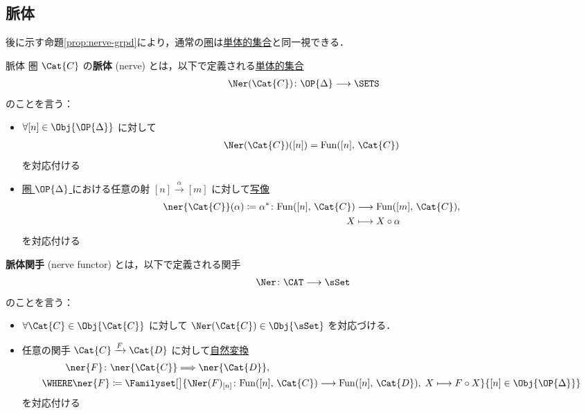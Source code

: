 \documentclass[TQFT_main]{subfiles}
\begin{document}
\subsection{脈体}

後に示す命題\ref{prop:nerve-grpd}により，通常の\hyperref[def:category]{圏}は\hyperref[def:SimpSet]{単体的集合}と同一視できる．

\begin{mydef}[label=def:nerve,breakable]{脈体}
        圏 $\Cat{C}$ の\textbf{脈体} (nerve) とは，以下で定義される\hyperref[def:SimpSet]{単体的集合}
        \begin{align}
            \Ner (\Cat{C}) \colon \OP{\Delta} \lto \SETS
        \end{align}
        のことを言う：
        \begin{itemize}
            \item $\forall [n] \in \Obj{\OP{\Delta}}$ に対して
            \begin{align}
                \Ner (\Cat{C}) ([n]) = \mathrm{Fun} ([n],\, \Cat{C})
            \end{align}
            を対応付ける
            \item \hyperref[def:simplex-cat]{圏 $\OP{\Delta}$ }における任意の射 $[n] \xrightarrow{\alpha} [m]$ に対して\underline{写像}
            \begin{align}
                \ner{\Cat{C}}(\alpha) \coloneqq \alpha^* \colon \mathrm{Fun}([n],\, \Cat{C}) &\lto \mathrm{Fun}([m],\, \Cat{C}),\\ 
                X &\lmto X \circ \alpha
            \end{align}
            を対応付ける
        \end{itemize}

        \tcblower

        \textbf{脈体関手} (nerve functor) とは，以下で定義される関手
        \begin{align}
            \Ner  \colon \CAT \lto \sSet
        \end{align}
        のことを言う：
        \begin{itemize}
            \item $\forall \Cat{C} \in \Obj{\Cat{C}}$ に対して $\Ner (\Cat{C}) \in \Obj{\sSet}$ を対応づける．
            \item 任意の関手 $\Cat{C} \xrightarrow{F} \Cat{D}$ に対して\hyperref[def:nat]{自然変換}
            \begin{align}
                \ner{F} \colon &\ner{\Cat{C}} \Longrightarrow \ner{\Cat{D}}, \\
                \WHERE \ner{F} &\coloneqq \Familyset[\big]{\Ner (F)_{[n]} \colon \mathrm{Fun}([n],\, \Cat{C}) \lto \mathrm{Fun}([n],\, \Cat{D}),\; X \lmto F \circ X}{[n] \in \Obj{\OP{\Delta}}}
            \end{align}
            を対応付ける
        \end{itemize}
\end{mydef}
\end{document}
